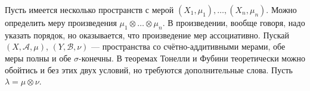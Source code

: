 \documentclass[a4paper]{report}
\begin{document}
    Пусть имеется несколько пространств с мерой $(X_1, \mu_1), \dots, (X_n, \mu_n)$.
    Можно определить меру произведения $\mu_1 \otimes \dots \otimes \mu_n$.
    В произведении, вообще говоря, надо указать порядок, но оказывается, что произведение мер ассоциативно.
    Пускай $(X, \mathcal{A}, \mu)$, $(Y, \mathcal{B}, \nu)$ --- пространства со счётно-аддитивными мерами, обе меры полны и обе $\sigma$-конечны.
    В теоремах Тонелли и Фубини теоретически можно обойтись и без этих двух условий, но требуются дополнительные слова. Пусть $\lambda = \mu \otimes \nu$.
\end{document}
